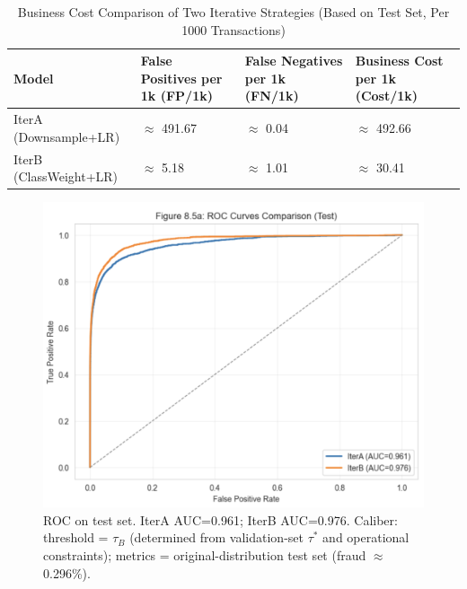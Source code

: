 \documentclass[sigplan,screen]{acmart}
\begin{document}
\begin{table}[h!]
    \centering
    \small
    \renewcommand{\arraystretch}{1.2}
    \begin{tabular}{|p{4cm}|p{3cm}|p{3cm}|p{3cm}|}
    \hline
    \textbf{Model} & \textbf{False Positives per 1k (FP/1k)} & \textbf{False Negatives per 1k (FN/1k)} & \textbf{Business Cost per 1k (Cost/1k)} \\
    \hline
    IterA (Downsample+LR) & $\approx$ 491.67 & $\approx$ 0.04 & $\approx$ 492.66 \\
    \hline
    IterB (ClassWeight+LR) & $\approx$ 5.18 & $\approx$ 1.01 & $\approx$ 30.41 \\
    \hline
    \end{tabular}
    \caption{Business Cost Comparison of Two Iterative Strategies (Based on Test Set, Per 1000 Transactions)}
    \label{tab:business_cost_comparison}
\end{table}

\begin{figure}[h!]
    \centering
    \includegraphics[width=0.9\columnwidth]{8.5a.png}
    \caption{ROC on test set. IterA AUC=0.961; IterB AUC=0.976. Caliber: threshold = $\tau_B$ (determined from validation-set $\tau^*$ and operational constraints); metrics = original-distribution test set (fraud $\approx$ 0.296\%).}
    \label{fig:8.5a}
\end{figure}
\end{document}
